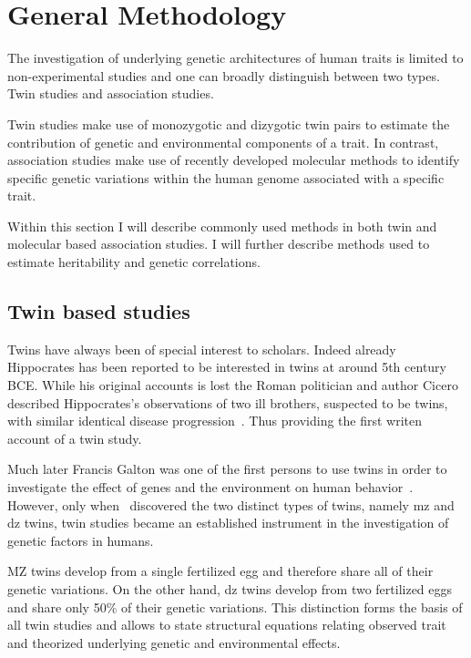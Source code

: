 \chapter{General Methodology}
\label{cha:methods_applied_in_genetic_studies_on_humans}

The investigation of underlying genetic architectures of human traits is limited to non-experimental studies and one can broadly distinguish between two types.
Twin studies and association studies.

Twin studies make use of monozygotic and dizygotic twin pairs to estimate the contribution of genetic and environmental components of a trait.
In contrast, association studies make use of recently developed molecular methods to identify specific genetic variations within the human genome associated with a specific trait.

Within this section I will describe commonly used methods in both twin and molecular based association studies.
I will further describe methods used to estimate heritability and genetic correlations.

\section{Twin based studies}
\label{sec:twin_based_studies}

Twins have always been of special interest to scholars.
Indeed already Hippocrates has been reported to be interested in twins at around 5th century BCE\@.
While his original accounts is lost the Roman politician and author Cicero described Hippocrates's observations of two ill brothers, suspected to be twins, with similar identical disease progression~\cite{Cicero44BC}.
Thus providing the first writen account of a twin study.

Much later Francis Galton was one of the first persons to use twins in order to investigate the effect of genes and the environment on human behavior~\cite{Rende1990}.
However, only when~\citet{Simens1924} discovered the two distinct types of twins, namely \acrfull{mz} and \acrfull{dz} twins, twin studies became an established instrument in the investigation of genetic factors in humans.

MZ twins develop from a single fertilized egg and therefore share all of their genetic variations.
On the other hand, \acrfull{dz} twins develop from two fertilized eggs and share only 50\% of their genetic variations.
This distinction forms the basis of all twin studies and allows to state structural equations relating observed trait and theorized underlying genetic and environmental effects.

